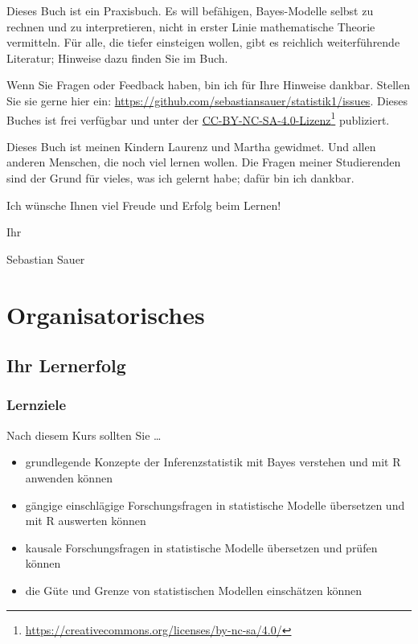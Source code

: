 \documentclass[
  ngerman,
  letterpaper,
  twoside,
  open=any]{scrbook}
\providecommand{\tightlist}{%
  \setlength{\itemsep}{0pt}\setlength{\parskip}{0pt}}\usepackage{longtable,booktabs,array}
\theoremstyle{definition}
\theoremstyle{plain}
\theoremstyle{definition}
\theoremstyle{definition}
\theoremstyle{remark}
\begin{document}
Dieses Buch ist ein Praxisbuch. Es will befähigen, Bayes-Modelle selbst
zu rechnen und zu interpretieren, nicht in erster Linie mathematische
Theorie vermitteln. Für alle, die tiefer einsteigen wollen, gibt es
reichlich weiterführende Literatur; Hinweise dazu finden Sie im Buch.

Wenn Sie Fragen oder Feedback haben, bin ich für Ihre Hinweise dankbar.
Stellen Sie sie gerne hier ein:
\url{https://github.com/sebastiansauer/statistik1/issues}. Dieses Buches
ist frei verfügbar und unter der
\href{https://creativecommons.org/licenses/by-nc-sa/4.0/}{CC-BY-NC-SA-4.0-Lizenz}\footnote{\url{https://creativecommons.org/licenses/by-nc-sa/4.0/}}
publiziert.

Dieses Buch ist meinen Kindern Laurenz und Martha gewidmet. Und allen
anderen Menschen, die noch viel lernen wollen. Die Fragen meiner
Studierenden sind der Grund für vieles, was ich gelernt habe; dafür bin
ich dankbar.

Ich wünsche Ihnen viel Freude und Erfolg beim Lernen!

Ihr

Sebastian Sauer

\clearpage 
\setcounter{tocdepth}{1}
\tableofcontents 

\cleardoublepage  %
\setcounter{page}{1}    %


\chapter{Organisatorisches}\label{organisatorisches}

\section{Ihr Lernerfolg}\label{ihr-lernerfolg}

\subsection{Lernziele}\label{lernziele}

Nach diesem Kurs sollten Sie \ldots{}

\begin{itemize}
\tightlist
\item
  grundlegende Konzepte der Inferenzstatistik mit Bayes verstehen und
  mit R anwenden können
\item
  gängige einschlägige Forschungsfragen in statistische Modelle
  übersetzen und mit R auswerten können
\item
  kausale Forschungsfragen in statistische Modelle übersetzen und prüfen
  können
\item
  die Güte und Grenze von statistischen Modellen einschätzen können
\end{itemize}
\end{document}
